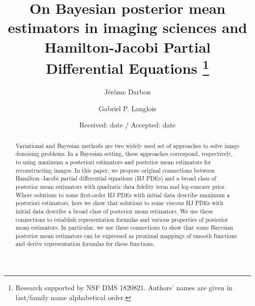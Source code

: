 \documentclass[smallcondensed]{svjour3}
\numberwithin{prop}{section}
\numberwithin{lem}{section}
\numberwithin{rem}{section}
\numberwithin{cor}{section}
\numberwithin{thm}{section}
\theoremstyle{plain}
\begin{document}
\title{On Bayesian posterior mean estimators in imaging sciences and Hamilton-Jacobi Partial Differential Equations \thanks{Research supported by NSF DMS 1820821. Authors' names are given in last/family name alphabetical order.}}

\date{Received: date / Accepted: date}

\author{J\'er\^ome Darbon \and 
Gabriel P. Langlois
}

\maketitle

\begin{abstract}
Variational and Bayesian methods are two widely used set of approaches to solve image denoising problems. In a Bayesian setting, these approaches correspond, respectively, to using maximum a posteriori estimators and posterior mean estimators for reconstructing images. In this paper, we propose original connections between Hamilton--Jacobi partial differential equations (HJ PDEs) and a broad class of posterior mean estimators with quadratic data fidelity term and log-concave prior. Where solutions to some first-order HJ PDEs with initial data describe maximum a posteriori estimators, here we show that solutions to some viscous HJ PDEs with initial data describe a broad class of posterior mean estimators. We use these connections to establish representation formulas and various properties of posterior mean estimators. In particular, we use these connections to show that some Bayesian posterior mean estimators can be expressed as proximal mappings of smooth functions and derive representation formulas for these functions.
\end{abstract}






\end{document}
